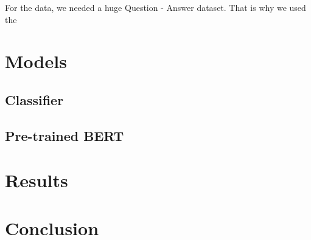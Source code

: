\documentclass{article}
\begin{document}
For the data, we needed a huge Question - Answer dataset. That is why we used the 

\section{Models}

\subsection{Classifier}

\subsection{Pre-trained BERT}

\section{Results}

\section{Conclusion}

\medskip

\printbibliography
\end{document}
